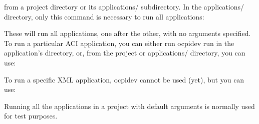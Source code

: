 \documentclass[10pt, a4paper, oneside]{article}
\renewcommand\_{\textunderscore\allowbreak} %
\begin{document}
\begin{ocpixml}
\end{ocpixml}
from a project directory or its applications/ subdirectory.  
In the applications/ directory, only this command is necessary to run all applications:
\begin{ocpixml}
\end{ocpixml}
These will run all applications, one after the other, with no arguments specified.   To run a particular ACI application, you can either run ocpidev run in the application's directory, or, from the project or applications/ directory, you can use:
\begin{ocpixml}
\end{ocpixml}
To run a specific XML application, ocpidev cannot be used (yet), but you can use:
\begin{ocpixml}
\end{ocpixml}
Running all the applications in a project with default arguments is normally used for test purposes.\\
\end{document}
